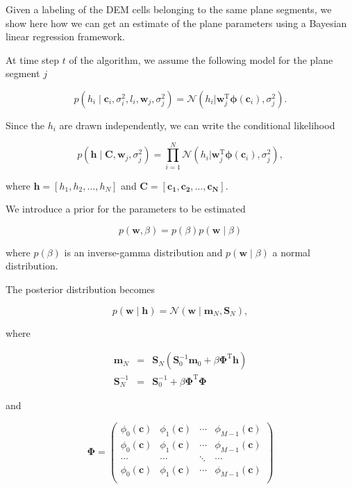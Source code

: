 Given a labeling of the DEM cells belonging to the same plane segments, we show
here how we can get an estimate of the plane parameters using a Bayesian linear
regression framework.

At time step $t$ of the algorithm, we assume the following model for the plane
segment $j$

\begin{equation}
\label{eqn:regression1}
p(h_i\mid\mathbf{c}_i,\sigma^2_i,l_i,\mathbf{w}_j,\sigma^2_j)=\mathcal{N}(h_i|\mathbf{w}_j^\text{T}
\boldsymbol{\phi}(\mathbf{c}_i),\sigma^2_j).
\end{equation}

Since the $h_i$ are drawn independently, we can write the conditional likelihood

\begin{equation}
\label{eqn:regression2}
p(\mathbf{h}\mid\mathbf{C},\mathbf{w}_j,\sigma^2_j)=\prod_{i=1}^N\mathcal{N}(h_i|
\mathbf{w}_j^\text{T}\boldsymbol{\phi}(\mathbf{c}_i),\sigma^2_j),
\end{equation}

where $\mathbf{h}=[h_1,h_2,\dots,h_N]$ and $\mathbf{C}=[\mathbf{c_1},
\mathbf{c_2},\dots,\mathbf{c_N}]$.

We introduce a prior for the parameters to be estimated

\begin{equation}
\label{eqn:regression3}
p(\mathbf{w},\beta)=p(\beta)p(\mathbf{w}\mid\beta)
\end{equation}

where $p(\beta)$ is an inverse-gamma distribution and
$p(\mathbf{w}\mid\beta)$ a normal distribution.

The posterior distribution becomes

\begin{equation}
\label{eqn:regression4}
p(\mathbf{w}\mid\mathbf{h})=\mathcal{N}(\mathbf{w}\mid \mathbf{m}_N,
\mathbf{S}_N),
\end{equation}

where

\begin{eqnarray}
\label{eqn:regression5}
\mathbf{m}_N&=&\mathbf{S}_N(\mathbf{S}_0^{-1}\mathbf{m}_0+\beta
\boldsymbol{\Phi}^\text{T}\mathbf{h})\\\nonumber
\mathbf{S}_N^{-1}&=&\mathbf{S}_0^{-1}+\beta\boldsymbol{\Phi}^\text{T}\boldsymbol{\Phi}
\end{eqnarray}

and

\begin{equation}
\label{eqn:regression6}
\boldsymbol{\Phi}=
\left(
\begin{array}{cccc}
\phi_0(\mathbf{c}) & \phi_1(\mathbf{c}) & \cdots & \phi_{M-1}(\mathbf{c})\\
\phi_0(\mathbf{c}) & \phi_1(\mathbf{c}) & \cdots & \phi_{M-1}(\mathbf{c})\\
\cdots             & \cdots             & \ddots & \cdots\\
\phi_0(\mathbf{c}) & \phi_1(\mathbf{c}) & \cdots & \phi_{M-1}(\mathbf{c})\\
\end{array} \right)
\end{equation}
